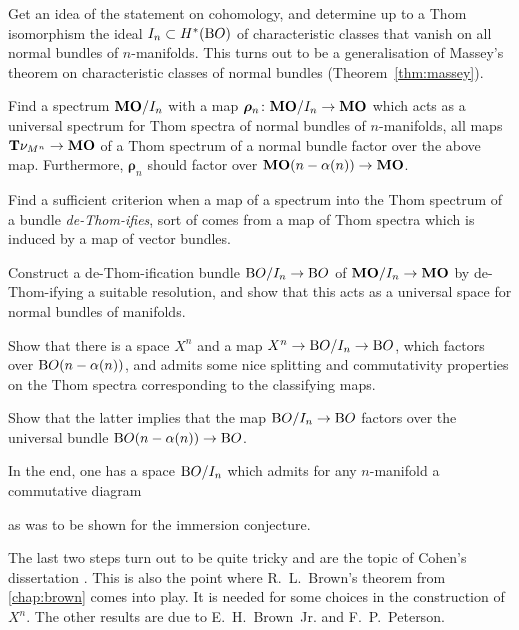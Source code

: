 \begin{steps}
\item
  Get an idea of the statement on cohomology, and determine up to a
  Thom isomorphism the ideal $I_{n}\subset H^*(\mathrm{B}O)$ of characteristic
  classes that vanish on all normal bundles of $n$-manifolds.
  This turns out to be a generalisation of Massey's theorem on
  characteristic classes of normal bundles (Theorem~\ref{thm:massey}).
\item
  Find a spectrum $\bm{\mathrm{MO}}/I_{n}$ with a map
  $\bm{\rho}_n\colon \bm{\mathrm{MO}}/I_{n}\to\bm{\mathrm{MO}}$ which acts as a universal
  spectrum for Thom spectra of normal bundles of $n$-manifolds,
  \idest all maps $\bm{\mathrm{T}}{\nu_{M^n}}\to \bm{\mathrm{MO}}$ of a Thom spectrum of a
  normal bundle factor over the above map.
  Furthermore, $\bm{\rho}_n$ should factor
  over $\bm{\mathrm{MO}}(n-\alpha(n))\to\bm{\mathrm{MO}}$.
\item
  Find a sufficient criterion when a map of a spectrum into the Thom
  spectrum of a bundle \emph{de-Thom-ifies}, \idest sort of
  comes from a map of Thom spectra which is induced by a map
  of vector bundles.
\item
  Construct a de-Thom-ification bundle $\mathrm{B}O/I_{n}\to\mathrm{B}O$ of $\bm{\mathrm{MO}}/I_{n}\to\bm{\mathrm{MO}}$ by de-Thom-ifying a suitable resolution,
  and show that this acts as a universal space for normal
  bundles of manifolds.
\item
  Show that there is a space $X^n$ and a map
  $X^n\to\mathrm{B}O/I_{n}\to\mathrm{B}O$, which factors over $\mathrm{B}O(n-\alpha(n))$, and
  admits some nice splitting and  commutativity properties on the Thom
  spectra corresponding to the classifying maps.
\item
  Show that the latter implies that the map $\mathrm{B}O/I_{n}\to\mathrm{B}O$ factors
  over the universal bundle $\mathrm{B}O(n-\alpha(n))\to\mathrm{B}O$.
\end{steps}
In the end, one has a space $\mathrm{B}O/I_{n}$ which admits for
any $n$-manifold a commutative diagram
\begin{center}
\end{center}
as was to be shown for the immersion conjecture.

The last two steps turn out to be quite tricky and are the topic of
Cohen's dissertation \cite{cohen}. This is also the point where
R.~L.~Brown's theorem from \autoref{chap:brown} comes into play.
It is needed for some choices in the construction of $X^n$.
The other results are due to E.~H.~Brown~Jr. and F.~P.~Peterson.

